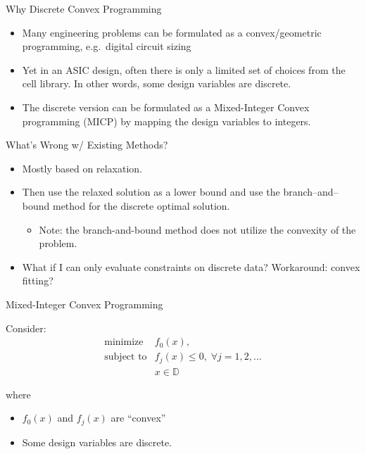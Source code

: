 \documentclass[
  ignorenonframetext,
  aspectratio=169,
  serif,onlymath]{beamer}
\providecommand{\tightlist}{%
  \setlength{\itemsep}{0pt}\setlength{\parskip}{0pt}}
\begin{document}
\begin{frame}{Why Discrete Convex Programming}
\protect\hypertarget{why-discrete-convex-programming}{}

\begin{itemize}
\item
  Many engineering problems can be formulated as a convex/geometric
  programming, e.g.~digital circuit sizing
\item
  Yet in an ASIC design, often there is only a limited set of choices
  from the cell library. In other words, some design variables are
  discrete.
\item
  The discrete version can be formulated as a Mixed-Integer Convex
  programming (MICP) by mapping the design variables to integers.
\end{itemize}

\end{frame}

\begin{frame}{What's Wrong w/ Existing Methods?}
\protect\hypertarget{whats-wrong-w-existing-methods}{}

\begin{itemize}
\item
  Mostly based on relaxation.
\item
  Then use the relaxed solution as a lower bound and use the
  branch--and--bound method for the discrete optimal solution.

  \begin{itemize}
  \tightlist
  \item
    Note: the branch-and-bound method does not utilize the convexity of
    the problem.
  \end{itemize}
\item
  What if I can only evaluate constraints on discrete data? Workaround:
  convex fitting?
\end{itemize}

\end{frame}

\begin{frame}{Mixed-Integer Convex Programming}
\protect\hypertarget{mixed-integer-convex-programming}{}

Consider: \[\begin{array}{ll}
        \text{minimize}      & f_0(x), \\
        \text{subject to}    & f_j(x) \leq 0, \; \forall j=1,2,\ldots \\
                             & x \in \mathbb{D} 
\end{array}\]

where

\begin{itemize}
\tightlist
\item
  \(f_0(x)\) and \(f_j(x)\) are ``convex''
\item
  Some design variables are discrete.
\end{itemize}

\end{frame}
\end{document}

